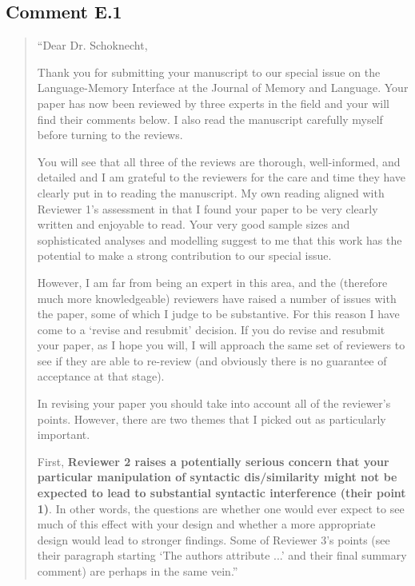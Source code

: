 \documentclass[12pt]{article}
\begin{document}
\subsection*{Comment E.1}
\begin{quote}
``Dear Dr. Schoknecht,

Thank you for submitting your manuscript to our special issue on the Language-Memory Interface at the Journal of Memory and Language. Your paper has now been reviewed by three experts in the field and your will find their comments below. I also read the manuscript carefully myself before turning to the reviews.

You will see that all three of the reviews are thorough, well-informed, and detailed and I am grateful to the reviewers for the care and time they have clearly put in to reading the manuscript. My own reading aligned with Reviewer 1's assessment in that I found your paper to be very clearly written and enjoyable to read. Your very good sample sizes and sophisticated analyses and modelling suggest to me that this work has the potential to make a strong contribution to our special issue.

However, I am far from being an expert in this area, and the (therefore much more knowledgeable) reviewers have raised a number of issues with the paper, some of which I judge to be substantive. For this reason I have come to a `revise and resubmit' decision. If you do revise and resubmit your paper, as I hope you will, I will approach the same set of reviewers to see if they are able to re-review (and obviously there is no guarantee of acceptance at that stage).

In revising your paper you should take into account all of the reviewer's points. However, there are two themes that I picked out as particularly important.

First, \textbf{Reviewer 2 raises a potentially serious concern that your particular manipulation of syntactic dis/similarity might not be expected to lead to substantial syntactic interference (their point 1)}. In other words, the questions are whether one would ever expect to see much of this effect with your design and whether a more appropriate design would lead to stronger findings. Some of Reviewer 3's points (see their paragraph starting `The authors attribute ...' and their final summary comment) are perhaps in the same vein.''
\end{quote}
\end{document}

